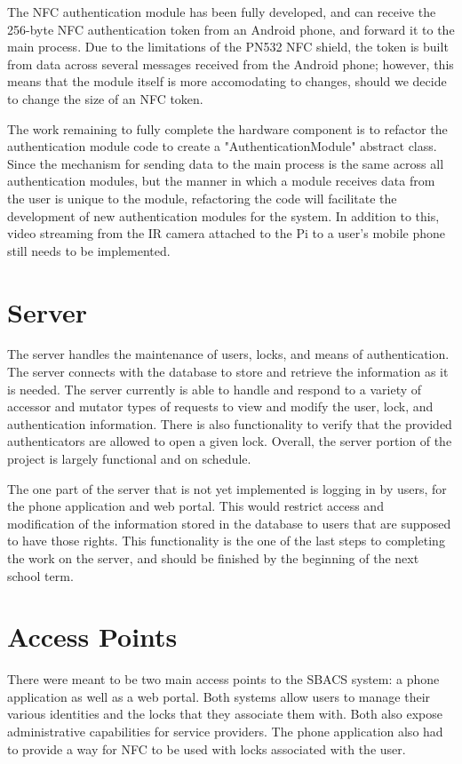 \documentclass{article}
\begin{document}
The NFC authentication module has been fully developed, and can receive the 256-byte NFC authentication token from an 
Android phone, and forward it to the main process. Due to the limitations of the PN532 NFC shield, the token is built 
from data across several messages received from the Android phone; however, this means that the module itself is more 
accomodating to changes, should we decide to change the size of an NFC token.

The work remaining to fully complete the hardware component is to refactor the authentication module code to create a 
"AuthenticationModule" abstract class. Since the mechanism for sending data to the main process is the same across all 
authentication modules, but the manner in which a module receives data from the user is unique to the module, 
refactoring the code will facilitate the development of new authentication modules for the system. In addition to this, 
video streaming from the IR camera attached to the Pi to a user's mobile phone still needs to be implemented.

\section{Server}

The server handles the maintenance of users, locks, and means of authentication. The server connects with the database
to store and retrieve the information as it is needed. The server currently is able to handle and respond to a variety
of accessor and mutator types of requests to view and modify the user, lock, and authentication information. There is
also functionality to verify that the provided authenticators are allowed to open a given lock. Overall, the server
portion of the project is largely functional and on schedule.

The one part of the server that is not yet implemented is logging in by users, for the phone application and web portal.
This would restrict access and modification of the information stored in the database to users that are supposed to have
those rights. This functionality is the one of the last steps to completing the work on the server, and should be finished
by the beginning of the next school term.

\section{Access Points}

There were meant to be two main access points to the SBACS system: a phone application as well as a web portal. Both
systems allow users to manage their various identities and the locks that they associate them with. Both also expose
administrative capabilities for service providers. The phone application also had to provide a way for NFC to be used
with locks associated with the user.
\end{document}
